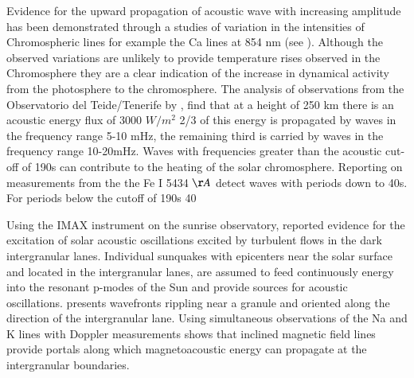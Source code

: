 \documentclass[authoryear,final,1p]{elsarticle}
\begin{document}
Evidence for the upward propagation of acoustic wave with increasing amplitude has been demonstrated through a studies of variation in the intensities of Chromospheric lines for example the Ca lines at 854 nm (see  \citet{Beck2012}). Although the observed variations are unlikely to provide temperature rises observed in the Chromosphere they are a clear indication of the increase in dynamical activity from the photosphere to the chromosphere. The analysis of observations from the Observatorio del Teide/Tenerife by  \citet{Bello2009}, find that at a height of 250 km there is an acoustic energy flux of $3000$ $W/m^2$  2/3 of this energy is propagated by waves in the frequency range 5-10 mHz, the remaining third is carried by waves in the frequency range 10-20mHz. Waves with frequencies greater than the acoustic cut-off of 190s can contribute to the heating of the solar chromosphere. Reporting on measurements from the the Fe I 5434 ${\AA}$ \citet{Bello2010A} detect waves with periods down to 40s. For periods below the cutoff of 190s 40%

Using the IMAX instrument on the sunrise observatory, \citet{Roth2010}  reported evidence for the excitation of solar acoustic oscillations excited by turbulent flows  in the dark intergranular lanes.  Individual sunquakes with epicenters near the solar surface and located in the intergranular lanes, are assumed to feed continuously energy into the resonant p-modes of the Sun and provide sources for acoustic oscillations. \citet{Roth2010} presents wavefronts rippling near a granule and oriented along the direction of the intergranular lane. Using simultaneous observations of the Na and K lines with Doppler measurements  \citet{Jefferies2006} shows that inclined magnetic field lines provide portals along which magnetoacoustic energy can propagate at the intergranular boundaries.
\end{document}

